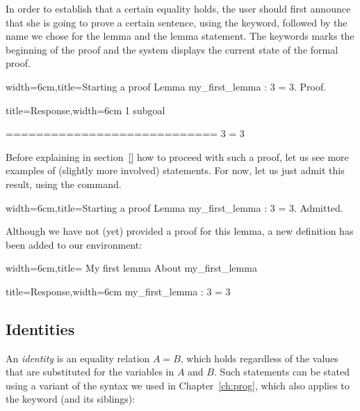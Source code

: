In order to establish that a certain equality holds, the user should
first announce that she is going to prove a certain sentence, using
the  keyword, followed by the name we chose for the lemma and
the lemma statement. 
The  keywords marks the beginning of the proof and the system
displays the current state of the formal proof.

\begin{coq}{width=6cm,title=Starting a proof}
Lemma my_first_lemma : 3 = 3.
Proof.
\end{coq}
\begin{coqout}{title=Response,width=6cm}
1 subgoal

  ============================
   3 = 3
\end{coqout}

Before explaining in section~\ref{} how to proceed with such a proof,
let us see more examples of (slightly more involved) statements.
For now, let us just admit this result, using the 
command.

\begin{coq}{width=6cm,title=Starting a proof}
Lemma my_first_lemma : 3 = 3.
Admitted.
\end{coq}

Although we have not (yet) provided a proof for this lemma, a new
definition has been added to our environment:

\begin{coq}{width=6cm,title= My first lemma}
About my_first_lemma
\end{coq}
\begin{coqout}{title=Response,width=6cm}
my_first_lemma : 3 = 3
\end{coqout}


\subsection{Identities}\label{ssec:id}


An \emph{identity} is an equality relation $A = B$, which holds
regardless of the values that are substituted for the variables in $A$
and $B$. Such statements can be stated using a variant of the
 syntax we used in Chapter~\ref{ch:prog}, which also
applies to the  keyword (and its siblings):

